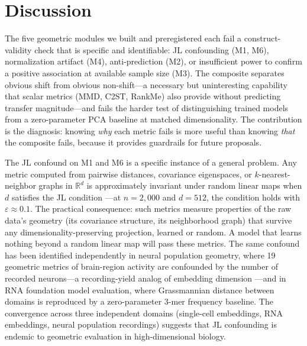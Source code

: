 \documentclass[9pt,lineno]{elife}
\begin{document}
\section{Discussion}

The five geometric modules we built and preregistered each fail a construct-validity check that is specific and identifiable: JL confounding (M1, M6), normalization artifact (M4), anti-prediction (M2), or insufficient power to confirm a positive association at available sample size (M3). The composite separates obvious shift from obvious non-shift---a necessary but uninteresting capability that scalar metrics (MMD, C2ST, RankMe) also provide without predicting transfer magnitude---and fails the harder test of distinguishing trained models from a zero-parameter PCA baseline at matched dimensionality. The contribution is the diagnosis: knowing \emph{why} each metric fails is more useful than knowing \emph{that} the composite fails, because it provides guardrails for future proposals.

The JL confound on M1 and M6 is a specific instance of a general problem. Any metric computed from pairwise distances, covariance eigenspaces, or $k$-nearest-neighbor graphs in $\mathbb{R}^d$ is approximately invariant under random linear maps when $d$ satisfies the JL condition \citep{johnsonlindenstrauss1984}---at $n = 2{,}000$ and $d = 512$, the condition holds with $\varepsilon \approx 0.1$. The practical consequence: such metrics measure properties of the raw data's geometry (its covariance structure, its neighborhood graph) that survive any dimensionality-preserving projection, learned or random. A model that learns nothing beyond a random linear map will pass these metrics. The same confound has been identified independently in neural population geometry, where 19 geometric metrics of brain-region activity are confounded by the number of recorded neurons---a recording-yield analog of embedding dimension \citep{tower2026bracket}---and in RNA foundation model evaluation, where Grassmannian distance between domains is reproduced by a zero-parameter 3-mer frequency baseline. The convergence across three independent domains (single-cell embeddings, RNA embeddings, neural population recordings) suggests that JL confounding is endemic to geometric evaluation in high-dimensional biology.
\end{document}
